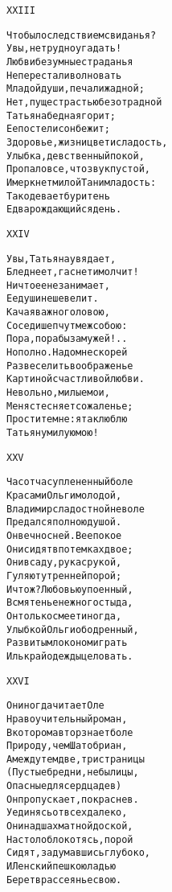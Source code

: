 \begin{minipage}[t]{\dimexpr 0.5\textwidth -\tabcolsep-.5pt}
\begin{alltt}\normalfont\centering
XXIII

Что было следствием свиданья?
Увы, не трудно угадать!
Любви безумные страданья
Не перестали волновать
Младой души, печали жадной;
Нет, пуще страстью безотрадной
Татьяна бедная горит;
Ее постели сон бежит;
Здоровье, жизни цвет и сладость,
Улыбка, девственный покой,
Пропало все, что звук пустой,
И меркнет милой Тани младость:
Так одевает бури тень
Едва рождающийся день.
\end{alltt}
\end{minipage}

\begin{minipage}[t]{\dimexpr 0.5\textwidth -\tabcolsep-.5pt}
\begin{alltt}\normalfont\centering
XXIV

Увы, Татьяна увядает,
Бледнеет, гаснет и молчит!
Ничто ее не занимает,
Ее души не шевелит.
Качая важно головою,
Соседи шепчут меж собою:
Пора, пора бы замуж ей!..
Но полно. Надо мне скорей
Развеселить воображенье
Картиной счастливой любви.
Невольно, милые мои,
Меня стесняет сожаленье;
Простите мне: я так люблю
Татьяну милую мою!
\end{alltt}
\end{minipage}
\clearpage

\begin{minipage}[t]{\dimexpr 0.5\textwidth -\tabcolsep-.5pt}
\begin{alltt}\normalfont\centering
XXV

Час от часу плененный боле
Красами Ольги молодой,
Владимир сладостной неволе
Предался полною душой.
Он вечно с ней. В ее покое
Они сидят в потемках двое;
Они в саду, рука с рукой,
Гуляют утренней порой;
И что ж? Любовью упоенный,
В смятенье нежного стыда,
Он только смеет иногда,
Улыбкой Ольги ободренный,
Развитым локоном играть
Иль край одежды целовать.
\end{alltt}
\end{minipage}

\begin{minipage}[t]{\dimexpr 0.5\textwidth -\tabcolsep-.5pt}
\begin{alltt}\normalfont\centering
XXVI

Он иногда читает Оле
Нравоучительный роман,
В котором автор знает боле
Природу, чем Шатобриан,
А между тем две, три страницы
(Пустые бредни, небылицы,
Опасные для сердца дев)
Он пропускает, покраснев.
Уединясь от всех далеко,
Они над шахматной доской,
На стол облокотясь, порой
Сидят, задумавшись глубоко,
И Ленский пешкою ладью
Берет в рассеянье свою.
\end{alltt}
\end{minipage}
\clearpage

